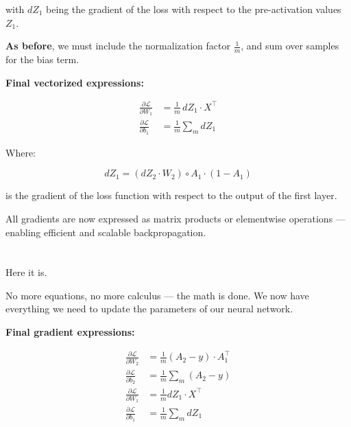 \documentclass[11pt]{article}
\begin{document}
with \( dZ_1 \) being the gradient of the loss with respect to the pre-activation values \( Z_1 \).

\vspace{1em}

\textbf{As before}, we must include the normalization factor \( \frac{1}{m} \),  
and sum over samples for the bias term.

\vspace{1em}

\textbf{Final vectorized expressions:}

\[
\boxed{
\begin{aligned}
\frac{\partial \mathcal{L}}{\partial W_1} &= \frac{1}{m} \, dZ_1 \cdot X^\top \\
\frac{\partial \mathcal{L}}{\partial b_1} &= \frac{1}{m} \sum_m dZ_1
\end{aligned}
}
\]

\vspace{1em}

Where:

\[
dZ_1 = (dZ_2 \cdot W_2) \circ A_1 \cdot (1 - A_1)
\]

is the gradient of the loss function with respect to the output of the first layer.

\begin{tcolorbox}[colback=green!5!white, colframe=green!60!black, title=Key Insight]
All gradients are now expressed as matrix products or elementwise operations  
— enabling efficient and scalable backpropagation.
\end{tcolorbox}

\section*{}

Here it is.

No more equations, no more calculus — the math is done.  
We now have everything we need to update the parameters of our neural network.

\vspace{1em}

\textbf{Final gradient expressions:}

\[
\boxed{
\begin{aligned}
\frac{\partial \mathcal{L}}{\partial W_2} &= \frac{1}{m} (A_2 - y) \cdot A_1^\top \\
\frac{\partial \mathcal{L}}{\partial b_2} &= \frac{1}{m} \sum_m (A_2 - y) \\
\frac{\partial \mathcal{L}}{\partial W_1} &= \frac{1}{m} dZ_1 \cdot X^\top \\
\frac{\partial \mathcal{L}}{\partial b_1} &= \frac{1}{m} \sum_m dZ_1
\end{aligned}
}
\]
\end{document}
